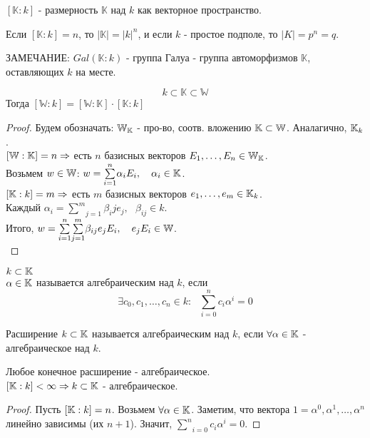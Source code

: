 \begin{defn} 
$[\mathbb{K}:k]$ - размерность $\mathbb{K}$ над $k$ как векторное пространство.
\end{defn}

Если $[\mathbb{K}:k] = n$, то $|\mathbb{K}| = |k|^n$, и если $k$ - простое подполе, то $|K| = p^n = q$.

ЗАМЕЧАНИЕ: $Gal(\mathbb{K}:k)$ - группа Галуа - группа автоморфизмов $\mathbb{K}$, оставляющих $k$ на месте.
\begin{thm}
\[k \subset \mathbb{K} \subset \mathbb{W}\]
Тогда $[\mathbb{W}:k] = [\mathbb{W}:\mathbb{K}] \cdot [\mathbb{K}:k]$
\end{thm}
\begin{proof}
Будем обозначать: $\mathbb{W}_{\mathbb{K}}$ - про-во, соотв. вложению $\mathbb{K} \subset \mathbb{W}$. Аналагично, $\mathbb{K}_k$.\\
$[\mathbb{W}:\mathbb{K}] = n \Rightarrow$ есть $n$ базисных векторов $E_1, \dots, E_n \in \mathbb{W}_{\mathbb{K}}$.\\
Возьмем $w \in \mathbb{W}$: $w = \underset{i = 1}{\overset{n}\sum}\alpha_iE_i,~~~\alpha_i \in \mathbb{K}$.\\

$[\mathbb{K}:k] = m \Rightarrow$ есть $m$ базисных векторов $e_1, \dots, e_m \in \mathbb{K}_k$.\\
Каждый $\alpha_i = \underset{j = 1}{\overset{m}\sum}\beta_ije_j,~~~\beta_{ij} \in k$.\\
Итого, $w = \underset{i = 1}{\overset{n}\sum}\underset{j = 1}{\overset{m}\sum}\beta_{ij} e_j E_i,~~~e_jE_i \in \mathbb{W}$.\\
\end{proof}

\begin{defn}
$k \subset \mathbb{K}$\\
$\alpha \in \mathbb{K}$ называется алгебраическим над $k$, если
\[\exists c_0, c_1, \dots, c_n \in k:~~~\underset{i = 0}{\overset{n}\sum}c_i\alpha^i = 0\]
\end{defn}

\begin{defn}
Расширение $k \subset \mathbb{K}$ называется алгебраическим над $k$, если $\forall \alpha \in \mathbb{K}$ - алгебраическое над $k$.
\end{defn}

\begin{thm}
Любое конечное расширение - алгебраическое.\\
$[\mathbb{K}:k] < \infty \Rightarrow k \subset \mathbb{K}$ - алгебраическое.
\end{thm}
\begin{proof}
Пусть $[\mathbb{K}:k] = n$. Возьмем $\forall \alpha \in \mathbb{K}$.
Заметим, что вектора $1 = \alpha^0, \alpha^1, \dots, \alpha^n$ линейно зависимы (их $n + 1$). Значит,
$\underset{i = 0}{\overset{n}\sum}c_i\alpha^i = 0$.
\end{proof}



